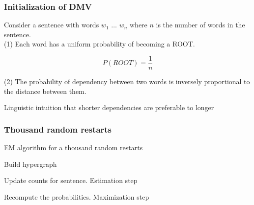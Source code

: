 \documentclass{beamer}
\begin{document}
\begin{frame}

\frametitle{Initialization of DMV}
Consider a sentence with words $w_1$ $\ldots$ $w_n$ where $n$ is the number of words in the sentence.\\

(1) Each word has a uniform probability of becoming a ROOT.

   $$ P(ROOT) =  \frac{1}{n} $$

(2) The probability of dependency between two words is inversely proportional to the distance between them.

Linguistic intuition that shorter dependencies are preferable to longer

\end{frame}

\begin{frame}
\frametitle{Thousand random restarts}

\begin{algorithm}[H]

\caption{EM algorithm for a thousand random restarts}

\begin{algorithmic}



      \State Build hypergraph


         \State Update counts for sentence.  Estimation step

      \EndFor

   \EndFor


    \State Recompute the probabilities.  Maximization step

  \EndFor

\EndFor

\end{algorithmic}
\end{algorithm}

\end{frame}
\end{document}
